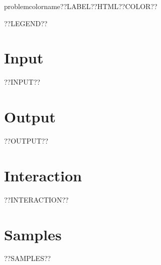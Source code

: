 \renewcommand\problemlabel{??LABEL??}
\renewcommand\problemcolor{??COLOR??}
\renewcommand\problemtitle{??TITLE??}
\renewcommand\timelimit{??TIMELIMIT??}
\renewcommand\memorylimit{??MEMORYLIMIT??}

\renewcommand\problemcolorname{problemcolorname\problemlabel}
\definecolor\problemcolorname{HTML}{\problemcolor}

\pagestyle{problem}

\problemheader

\let\problemfooter\undefined

??LEGEND??

\section*{Input}
??INPUT??

\section*{Output}
??OUTPUT??

\section*{Interaction}
??INTERACTION??

\section*{Samples}
??SAMPLES??

\ifdefined\problemfooter
 \begin{tiny}
  \begin{flushleft}
	\vspace{1cm}\noindent
\problemfooter
    \end{flushleft}
  \end{tiny}
\fi  

  